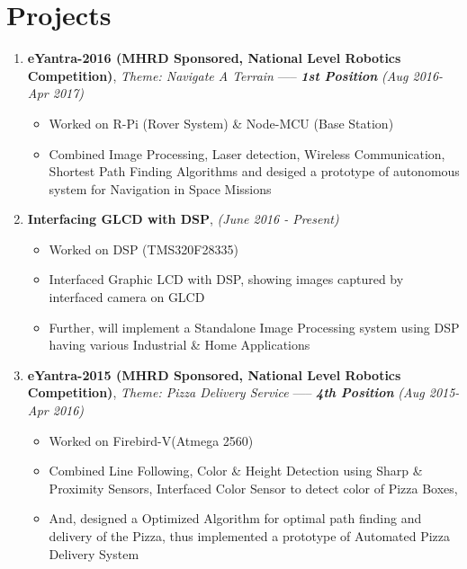 \documentclass[10pt,a4paper,sans]{moderncv} %
\begin{document}

\section{Projects}


\begin{enumerate}

\item \textbf{eYantra-2016 (MHRD Sponsored, National Level Robotics Competition)}, \newline\textit{Theme: Navigate A Terrain}  ----- \textbf{\textit{1st Position}}       \textit{ (Aug 2016- Apr 2017) }
\begin{itemize}
\item Worked on R-Pi (Rover System) \& Node-MCU (Base Station)
\item Combined Image Processing, Laser detection, Wireless Communication, Shortest Path Finding Algorithms and desiged a prototype of autonomous system for Navigation in Space Missions
\newline
\end{itemize}

\item \textbf{Interfacing GLCD with DSP},     \textit{ (June 2016 - Present) }
\begin{itemize}
\item Worked on DSP (TMS320F28335)
\item Interfaced Graphic LCD with DSP, showing images captured by interfaced camera on GLCD
\item Further, will implement a Standalone Image Processing system using DSP having various Industrial \& Home Applications
\newline
\end{itemize}

\item \textbf{eYantra-2015  (MHRD Sponsored, National Level Robotics Competition)}, \newline\textit{Theme: Pizza Delivery Service} ----- \textbf{\textit{4th Position}}                  \textit{ (Aug 2015- Apr 2016) }
\begin{itemize}
\item Worked on Firebird-V(Atmega 2560)
\item Combined Line Following, Color \& Height Detection using Sharp \& Proximity Sensors, Interfaced Color Sensor to detect color of Pizza Boxes, 
\item And, designed a Optimized Algorithm for optimal path finding and delivery of the Pizza, thus implemented a prototype of Automated Pizza Delivery System
\newline
\end{itemize}


\end{enumerate}
\end{document}
